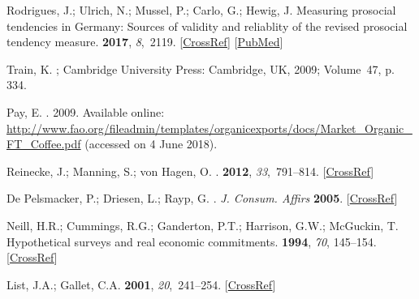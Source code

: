 \documentclass[sustainability,article,accept,moreauthors,pdftex,10pt,a4paper]{Definitions/mdpi}
\theoremstyle{mdpi}
\newcounter{ex}
\newcounter{re}
\theoremstyle{mdpidefinition}
\begin{document}
{\begin{thebibliography}{999}
Rodrigues, J.; Ulrich, N.; Mussel, P.; Carlo, G.; Hewig, J.
\newblock Measuring prosocial tendencies in Germany: Sources of validity and
reliablity of the revised prosocial tendency measure.
 {\bf 2017}, {\em 8},~2119. [\href{http://dx.doi.org/10.3389/fpsyg.2017.02119}{CrossRef}] [\href{http://www.ncbi.nlm.nih.gov/pubmed/29270144}{PubMed}]

Train, K.
;  Cambridge
University Press:  Cambridge, UK, 2009; Volume~47, p. 334.

Pay, E.
.
2009. Available online:
\newblock
\url{http://www.fao.org/fileadmin/templates/organicexports/docs/Market\_Organic\_FT\_Coffee.pdf} (accessed on 4 June 2018).

Reinecke, J.; Manning, S.; von Hagen, O.
.
 {\bf 2012}, {\em 33},~791--814. [\href{http://dx.doi.org/10.1177/0170840612443629}{CrossRef}]

{De Pelsmacker}, P.; Driesen, L.; Rayp, G.
. \emph{J. Consum. Affirs}  \textbf{2005}. [\href{http://dx.doi.org/10.1111/j.1745-6606.2005.00019.x}{CrossRef}]

Neill, H.R.; Cummings, R.G.; Ganderton, P.T.; Harrison, G.W.; McGuckin, T.
\newblock Hypothetical surveys and real economic commitments.
 {\bf 1994}, \emph{70},  145--154. [\href{http://dx.doi.org/10.2307/3146318}{CrossRef}]

List, J.A.; Gallet, C.A.
 {\bf 2001}, {\em
20},~241--254. [\href{http://dx.doi.org/10.1023/A:1012791822804}{CrossRef}]


\end{thebibliography}}
\end{document}
